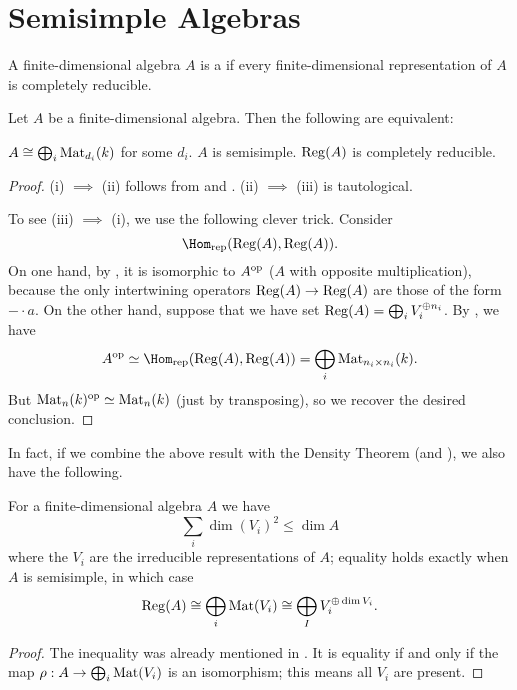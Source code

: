 \documentclass[11pt]{scrreprt}
\begin{document}
\section{Semisimple Algebras}

\begin{definition}
	A finite-dimensional algebra $A$ is a 
	if every finite-dimensional representation of $A$ is completely reducible.
\end{definition}

\begin{theorem}
	Let $A$ be a finite-dimensional algebra.
	Then the following are equivalent:
	\begin{enumerate}[(i)]
		\ii $A \cong \bigoplus_i \mathrm{Mat}_{d_i}(k)$ for some $d_i$.
		\ii $A$ is semisimple.
		\ii $\operatorname{Reg}(A)$ is completely reducible.
	\end{enumerate}
\end{theorem}
\begin{proof}
	(i) $\implies$ (ii) follows
	from  and .
	(ii) $\implies$ (iii) is tautological.

	To see (iii) $\implies$ (i), we use the following clever trick.
	Consider
	\[ \Homrep(\Reg(A), \Reg(A)). \]
	On one hand, by ,
	it is isomorphic to $A^{\mathrm{op}}$ ($A$ with opposite multiplication),
	because the only intertwining operators $\operatorname{Reg}(A) \to \operatorname{Reg}(A)$
	are those of the form $- \cdot a$.
	On the other hand, suppose that we have set
	$ \operatorname{Reg}(A) = \bigoplus_i V_i^{\oplus n_i} $.
	By , we have
	\[ A\op \simeq \Homrep(\Reg(A), \Reg(A))
		= \bigoplus_i \Mat_{n_i \times n_i}(k). \]
	But $\mathrm{Mat}_n(k)^{\mathrm{op}} \simeq \mathrm{Mat}_n(k)$ (just by transposing),
	so we recover the desired conclusion.
\end{proof}

In fact, if we combine the above result with
the Density Theorem (and ), we also have the following.
\begin{theorem}
	For a finite-dimensional algebra $A$ we have
	\[ \sum_{i} \dim(V_i)^2 \le \dim A \]
	where the $V_i$ are the irreducible representations of $A$;
	equality holds exactly when $A$ is semisimple,
	in which case 
	\[ \operatorname{Reg}(A) \cong \bigoplus_i \mathrm{Mat}(V_i)
		\cong \bigoplus_I V_i^{\oplus \dim V_i}. \]
\end{theorem}
\begin{proof}
	The inequality was already mentioned in .
	It is equality if and only if the map $\rho : A \to \bigoplus_i \mathrm{Mat}(V_i)$
	is an isomorphism; this means all $V_i$ are present.
\end{proof}
\end{document}
